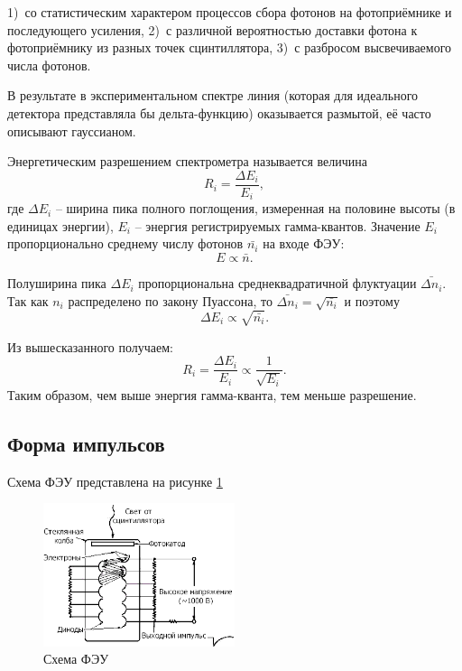 \documentclass[a4paper, 12pt]{article}
\begin{document}
            1)~со статистическим характером процессов сбора фотонов на фотоприёмнике и последующего усиления,
            2)~с различной вероятностью доставки фотона к фотоприёмнику из разных точек сцинтиллятора,
            3)~с разбросом высвечиваемого числа фотонов.

            В результате в экспериментальном спектре линия (которая для идеального детектора представляла бы дельта-функцию) оказывается размытой, её часто описывают гауссианом.

            Энергетическим разрешением спектрометра называется величина
            $$
                R_i = \frac{\Delta E_i}{E_i},
            $$
            где $\Delta E_i$ -- ширина пика полного поглощения, измеренная на половине высоты (в единицах энергии), $E_i$ -- энергия регистрируемых гамма-квантов. Значение $E_i$ пропорционально среднему числу фотонов $\bar{n_i}$ на входе ФЭУ:
            $$
                E \propto \bar{n}.
            $$

            Полуширина пика $\Delta E_i$ пропорциональна среднеквадратичной флуктуации $\bar{\Delta n_i}$. Так как $n_i$ распределено по закону Пуассона, то $\bar{\Delta n_i} = \sqrt{\bar{n_i}}$ и поэтому
            $$
                \Delta E_i \propto \sqrt{\bar{n_i}}.
            $$

            Из вышесказанного получаем:
            \begin{equation}
                R_i = \frac{\Delta E_i}{E_i} \propto \frac{1}{\sqrt{E_i}}.
                \label{eq:R}
            \end{equation}
            Таким образом, чем выше энергия гамма-кванта, тем меньше разрешение.

        \subsection{Форма импульсов}

            Схема ФЭУ представлена на рисунке \ref{img:FEU}

            \begin{figure}[h!]
                \begin{center}
                    \includegraphics[width = 0.5\textwidth]{img/FEU.png}
                    \caption{Схема ФЭУ}
                    \label{img:FEU}
                \end{center}
            \end{figure}
\end{document}
